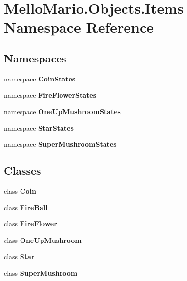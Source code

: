 \section{Mello\+Mario.\+Objects.\+Items Namespace Reference}
\label{namespaceMelloMario_1_1Objects_1_1Items}
\subsection*{Namespaces}
\begin{DoxyCompactItemize}
\item 
namespace \textbf{ Coin\+States}
\item 
namespace \textbf{ Fire\+Flower\+States}
\item 
namespace \textbf{ One\+Up\+Mushroom\+States}
\item 
namespace \textbf{ Star\+States}
\item 
namespace \textbf{ Super\+Mushroom\+States}
\end{DoxyCompactItemize}
\subsection*{Classes}
\begin{DoxyCompactItemize}
\item 
class \textbf{ Coin}
\item 
class \textbf{ Fire\+Ball}
\item 
class \textbf{ Fire\+Flower}
\item 
class \textbf{ One\+Up\+Mushroom}
\item 
class \textbf{ Star}
\item 
class \textbf{ Super\+Mushroom}
\end{DoxyCompactItemize}
